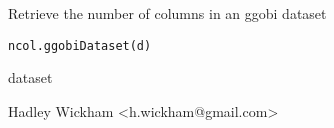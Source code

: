 \begin{Description}\relax
Retrieve the number of columns in an ggobi dataset
\end{Description}
\begin{Usage}
\begin{verbatim}ncol.ggobiDataset(d)\end{verbatim}
\end{Usage}
\begin{Arguments}
\begin{ldescription}
\item[\code{d}] dataset
\end{ldescription}
\end{Arguments}
\begin{Details}\relax
\end{Details}
\begin{Author}\relax
Hadley Wickham <h.wickham@gmail.com>
\end{Author}
\begin{Examples}
\begin{ExampleCode}\end{ExampleCode}
\end{Examples}

